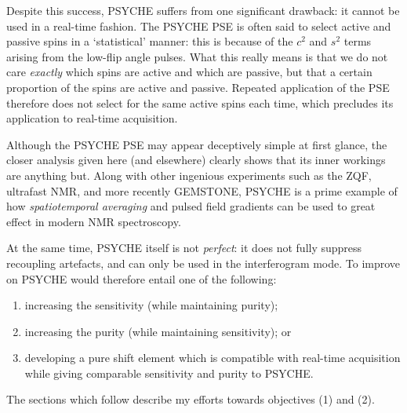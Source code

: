 Despite this success, PSYCHE suffers from one significant drawback: it cannot be used in a real-time fashion.
The PSYCHE PSE is often said to select active and passive spins in a `statistical' manner: this is because of the $c^2$ and $s^2$ terms arising from the low-flip angle pulses.
What this really means is that we do not care \textit{exactly} which spins are active and which are passive, but that a certain proportion of the spins are active and passive.
Repeated application of the PSE therefore does not select for the same active spins each time, which precludes its application to real-time acquisition.

Although the PSYCHE PSE may appear deceptively simple at first glance, the closer analysis given here (and elsewhere\autocite{Foroozandeh2018CEJ}) clearly shows that its inner workings are anything but.
Along with other ingenious experiments such as the ZQF\autocite{Thrippleton2005JMR}, ultrafast NMR\autocite{Frydman2002PNASUSA,Pelupessy2003JACS,Frydman2003JACS}, and more recently GEMSTONE\autocite{Kiraly2021ACIE}, PSYCHE is a prime example of how \textit{spatiotemporal averaging} and pulsed field gradients can be used to great effect in modern NMR spectroscopy.\autocite{Dumez2018PNMRS}

At the same time, PSYCHE itself is not \textit{perfect}: it does not fully suppress recoupling artefacts, and can only be used in the interferogram mode.
To improve on PSYCHE would therefore entail one of the following:
\begin{enumerate}
    \item increasing the sensitivity (while maintaining purity);
    \item increasing the purity (while maintaining sensitivity); or
    \item developing a pure shift element which is compatible with real-time acquisition while giving comparable sensitivity and purity to PSYCHE.
\end{enumerate}

The sections which follow describe my efforts towards objectives (1) and (2).

